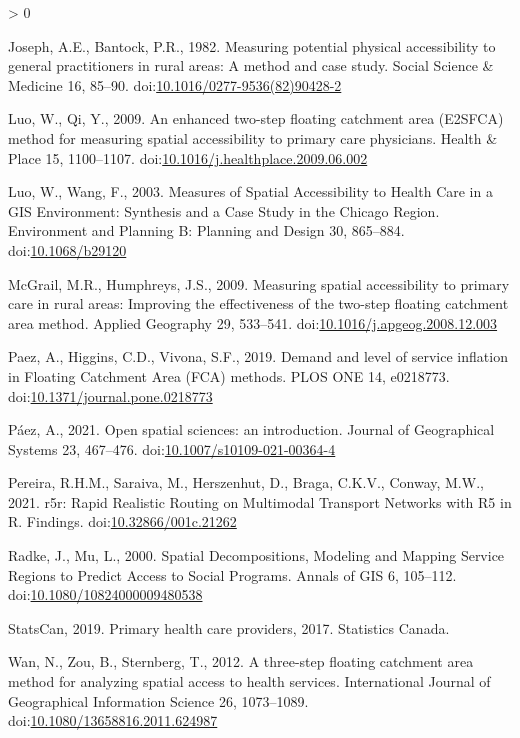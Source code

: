 \documentclass[]{elsarticle} %
\newlength{\cslhangindent}
\newenvironment{CSLReferences}[2] %
 {%
  \setlength{\parindent}{0pt}
  \ifodd #1 \everypar{\setlength{\hangindent}{\cslhangindent}}\ignorespaces\fi
  \ifnum #2 > 0
  \setlength{\parskip}{#2\baselineskip}
  \fi
 }%
 {}
\begin{document}
\begin{CSLReferences}{1}{0}
\leavevmode\hypertarget{ref-joseph1982}{}%
Joseph, A.E., Bantock, P.R., 1982. Measuring potential physical
accessibility to general practitioners in rural areas: A method and case
study. Social Science \& Medicine 16, 85--90.
doi:\href{https://doi.org/10.1016/0277-9536(82)90428-2}{10.1016/0277-9536(82)90428-2}

\leavevmode\hypertarget{ref-luo2009}{}%
Luo, W., Qi, Y., 2009. An enhanced two-step floating catchment area
(E2SFCA) method for measuring spatial accessibility to primary care
physicians. Health \& Place 15, 1100--1107.
doi:\href{https://doi.org/10.1016/j.healthplace.2009.06.002}{10.1016/j.healthplace.2009.06.002}

\leavevmode\hypertarget{ref-luo2003}{}%
Luo, W., Wang, F., 2003. Measures of Spatial Accessibility to Health
Care in a GIS Environment: Synthesis and a Case Study in the Chicago
Region. Environment and Planning B: Planning and Design 30, 865--884.
doi:\href{https://doi.org/10.1068/b29120}{10.1068/b29120}

\leavevmode\hypertarget{ref-mcgrail2009}{}%
McGrail, M.R., Humphreys, J.S., 2009. Measuring spatial accessibility to
primary care in rural areas: Improving the effectiveness of the two-step
floating catchment area method. Applied Geography 29, 533--541.
doi:\href{https://doi.org/10.1016/j.apgeog.2008.12.003}{10.1016/j.apgeog.2008.12.003}

\leavevmode\hypertarget{ref-paez2019}{}%
Paez, A., Higgins, C.D., Vivona, S.F., 2019. Demand and level of service
inflation in Floating Catchment Area (FCA) methods. PLOS ONE 14,
e0218773.
doi:\href{https://doi.org/10.1371/journal.pone.0218773}{10.1371/journal.pone.0218773}

\leavevmode\hypertarget{ref-paez2021}{}%
Páez, A., 2021. Open spatial sciences: an introduction. Journal of
Geographical Systems 23, 467--476.
doi:\href{https://doi.org/10.1007/s10109-021-00364-4}{10.1007/s10109-021-00364-4}

\leavevmode\hypertarget{ref-pereira2021}{}%
Pereira, R.H.M., Saraiva, M., Herszenhut, D., Braga, C.K.V., Conway,
M.W., 2021. r5r: Rapid Realistic Routing on Multimodal Transport
Networks with R5 in R. Findings.
doi:\href{https://doi.org/10.32866/001c.21262}{10.32866/001c.21262}

\leavevmode\hypertarget{ref-radke2000}{}%
Radke, J., Mu, L., 2000. Spatial Decompositions, Modeling and Mapping
Service Regions to Predict Access to Social Programs. Annals of GIS 6,
105--112.
doi:\href{https://doi.org/10.1080/10824000009480538}{10.1080/10824000009480538}

\leavevmode\hypertarget{ref-statcan2019}{}%
StatsCan, 2019. Primary health care providers, 2017. Statistics Canada.

\leavevmode\hypertarget{ref-wan2012}{}%
Wan, N., Zou, B., Sternberg, T., 2012. A three-step floating catchment
area method for analyzing spatial access to health services.
International Journal of Geographical Information Science 26,
1073--1089.
doi:\href{https://doi.org/10.1080/13658816.2011.624987}{10.1080/13658816.2011.624987}

\end{CSLReferences}
\end{document}

